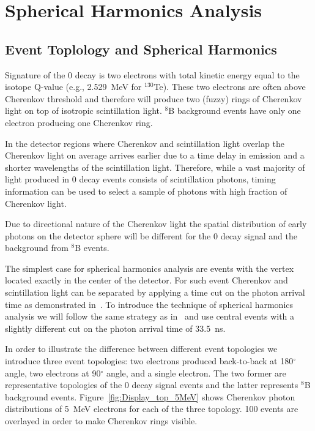 \section{Spherical Harmonics Analysis}
\label{sec:spherical_harmonics}

\subsection{Event Toplology and Spherical Harmonics}
\label{sec:topology_and_harmonics}
Signature of the 0{\nbb} decay is two electrons with total kinetic
energy equal to the isotope Q-value (e.g., 2.529~MeV for $^{130}$Te). These
two electrons are often above Cherenkov threshold and therefore will
produce two (fuzzy) rings of Cherenkov light on top of isotropic
scintillation light. $^{8}$B background events have only one electron
producing one Cherenkov ring.

In the detector regions where Cherenkov and scintillation light
overlap the Cherenkov light on average arrives earlier due to a time
delay in emission and a shorter wavelengths of the scintillation
light. Therefore, while a vast majority of light produced in
0{\nbb} decay events consists of scintillation photons, timing
information can be used to select a sample of photons with high
fraction of Cherenkov light.

Due to directional nature of the Cherenkov light the spatial
distribution of early photons on the detector sphere will be different
for the 0{\nbb} decay signal and the background from $^{8}$B events.



The simplest case for spherical harmonics analysis are events with the
vertex located exactly in the center of the detector. For such event
Cherenkov and scintillation light can be separated by applying a time
cut on the photon arrival time as demonstrated
in~\cite{Aberle2014}. To introduce the technique of spherical
harmonics analysis we will follow the same strategy as
in~\cite{Aberle2014} and use central events with a slightly
different cut on the photon arrival time of 33.5~ns.

In order to illustrate the difference between different event
topologies we introduce three event topologies: two electrons produced
back-to-back at 180$^{\circ}$ angle, two electrons at 90$^{\circ}$
angle, and a single electron. The two former are representative
topologies of the 0{\nbb} decay signal events and the latter represents
$^{8}$B background events. Figure~\ref{fig:Display_top_5MeV} shows
Cherenkov photon distributions of 5~MeV electrons for each of the
three topology. 100 events are overlayed in order to make Cherenkov
rings visible.

